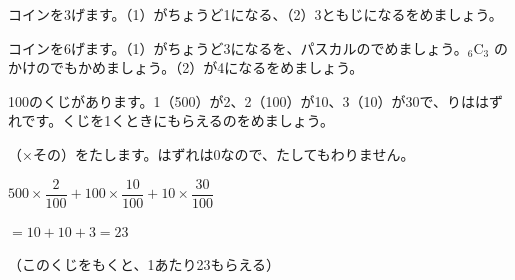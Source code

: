 \begingroup{}%
\noindent\begin{minipage}[t]{0.49\linewidth}
\begin{jibun}
コインを3げます。（1）がちょうど1になる、（2）3ともじになるをめましょう。
\end{jibun}
\end{minipage}\hfill
\begin{minipage}[t]{0.49\linewidth}
\begin{jibun}
コインを6げます。（1）がちょうど3になるを、パスカルのでめましょう。${}_6\mathrm{C}_3$ のかけのでもかめましょう。（2）が4になるをめましょう。
\end{jibun}
\end{minipage}\par
\endgroup

\begin{reidai}[\R{期待値}{き|たい|ち}を\R{求}{もと}める]
100のくじがあります。1（500）が2、2（100）が10、3（10）が30で、りははずれです。くじを1くときにもらえるのをめましょう。\par
\kangaekata （×その）をたします。はずれは0なので、たしてもわりません。\par
\shiki $500\times\dfrac{2}{100}+100\times\dfrac{10}{100}+10\times\dfrac{30}{100}$\par
\hspace*{2.6\zw}$=10+10+3=23$\par
{}（このくじをもくと、1あたり23もらえる）
\end{reidai}

